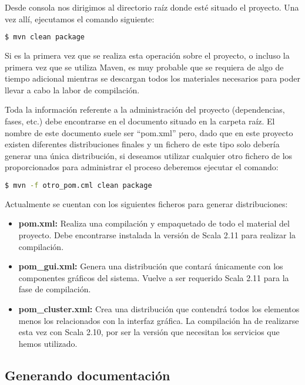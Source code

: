Desde consola nos dirigimos al directorio raíz donde esté situado el proyecto. Una vez allí, ejecutamos el comando siguiente:

\begin{lstlisting}[language=bash]
$ mvn clean package
\end{lstlisting}

Si es la primera vez que se realiza esta operación sobre el proyecto, o incluso la primera vez que se utiliza Maven, es muy probable que se requiera de algo de tiempo adicional mientras se descargan todos los materiales necesarios para poder llevar a cabo la labor de compilación.

Toda la información referente a la administración del proyecto (dependencias, fases, etc.) debe encontrarse en el documento situado en la carpeta raíz. El nombre de este documento suele ser ``pom.xml'' pero, dado que en este proyecto existen diferentes distribuciones finales y un fichero de este tipo solo debería generar una única distribución, si deseamos utilizar cualquier otro fichero de los proporcionados para administrar el proceso deberemos ejecutar el comando:

\begin{lstlisting}[language=bash]
$ mvn -f otro_pom.cml clean package
\end{lstlisting}

Actualmente se cuentan con los siguientes ficheros para generar distribuciones:
\begin{itemize}
\item \textbf{pom.xml:} Realiza una compilación y empaquetado de todo el material del proyecto. Debe encontrarse instalada la versión de Scala 2.11 para realizar la compilación.
\item \textbf{pom\_gui.xml:} Genera una distribución que contará únicamente con los componentes gráficos del sistema. Vuelve a ser requerido Scala 2.11 para la fase de compilación.
\item \textbf{pom\_cluster.xml:} Crea una distribución que contendrá todos los elementos menos los relacionados con la interfaz gráfica. La compilación ha de realizarse esta vez con Scala 2.10, por ser la versión que necesitan los servicios que hemos utilizado.
\end{itemize}

\subsection{Generando documentación}\label{subsec:documentacion}

